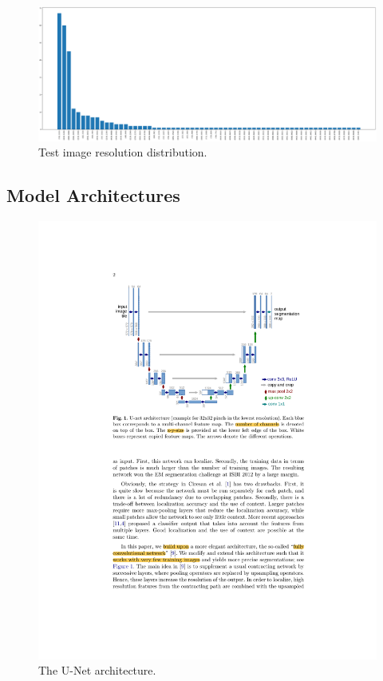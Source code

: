 \begin{figure}[htb!]
  \centering
  \includegraphics[width=\textwidth]{assets/test_image_resolutions.pdf}
  \caption{Test image resolution distribution.}
  \label{figure:3}
\end{figure}

\subsection{Model Architectures}

\begin{figure}[htb!]
  \centering
  \includegraphics[width=\textwidth]{assets/u_net.pdf}
  \caption[Lesion Images]{The U-Net architecture.}
  \label{u_net}
\end{figure}

